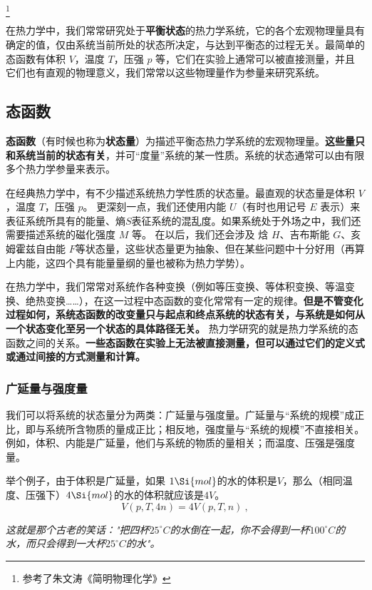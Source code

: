 \footnote{参考了朱文涛《简明物理化学》}


在热力学中，我们常常研究处于\textbf{平衡状态}的热力学系统，它的各个宏观物理量具有确定的值，仅由系统当前所处的状态所决定，与达到平衡态的过程无关。最简单的态函数有体积 $V$，温度 $T$，压强 $p$ 等，它们在实验上通常可以被直接测量，并且它们也有直观的物理意义，我们常常以这些物理量作为参量来研究系统。
\subsection{态函数}
\textbf{态函数}（有时候也称为\textbf{状态量}）为描述平衡态热力学系统的宏观物理量。\textbf{这些量只和系统当前的状态有关}，并可“度量”系统的某一性质。系统的状态通常可以由有限多个热力学参量来表示。

在经典热力学中，有不少描述系统热力学性质的状态量。最直观的状态量是体积 $V$，温度 $T$，压强 $p$。 更深刻一点，我们还使用内能 $U$（有时也用记号 $E$ 表示）来表征系统所具有的能量、熵$S$表征系统的混乱度。如果系统处于外场之中，我们还需要描述系统的磁化强度 $M$ 等。 在以后，我们还会涉及 焓 $H$、吉布斯能 $G$、亥姆霍兹自由能 $F$等状态量，这些状态量更为抽象、但在某些问题中十分好用（再算上内能，这四个具有能量量纲的量也被称为热力学势）。

在热力学中，我们常常对系统作各种变换（例如等压变换、等体积变换、等温变换、绝热变换……），在这一过程中态函数的变化常常有一定的规律。\textbf{但是不管变化过程如何，系统态函数的改变量只与起点和终点系统的状态有关，与系统是如何从一个状态变化至另一个状态的具体路径无关。} 热力学研究的就是热力学系统的态函数之间的关系。\textbf{一些态函数在实验上无法被直接测量，但可以通过它们的定义式或通过间接的方式测量和计算。}

\subsubsection{广延量与强度量}
我们可以将系统的状态量分为两类：广延量与强度量。广延量与“系统的规模”成正比，即与系统所含物质的量成正比；相反地，强度量与“系统的规模”不直接相关。例如，体积、内能是广延量，他们与系统的物质的量相关；而温度、压强是强度量。

举个例子，由于体积是广延量，如果 $1 \Si {mol}$的水的体积是$V$，那么（相同温度、压强下）$4 \Si {mol}$的水的体积就应该是$4 V$。
$$
V(p,T,4n) = 4V(p,T,n)~,
$$

\textsl{这就是那个古老的笑话："把四杯$25 ^\circ C$的水倒在一起，你不会得到一杯$100 ^\circ C$的水，而只会得到一大杯$25 ^\circ C$的水"。}

